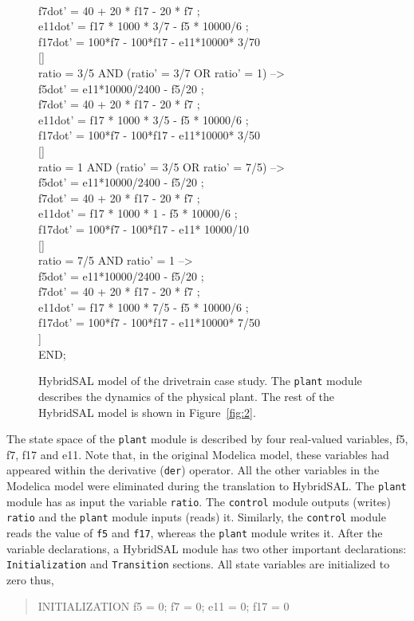 \documentclass{llncs}
\begin{document}
\begin{figure}[htb!]
\begin{tt}
\begin{tabbing}
\\ \>
  f7dot' = 40 + 20 * f17 - 20 * f7 ;
\\ \>
  e11dot' = f17 * 1000 * 3/7 - f5 * 10000/6 ;
\\ \>
  f17dot' = 100*f7 - 100*f17 - e11*10000* 3/70
\\
 \mbox{[]}
\\
ratio = 3/5 AND (ratio' = 3/7 OR ratio' = 1) --> 
\\ \>
  f5dot' = e11*10000/2400 - f5/20 ;
\\ \>
  f7dot' = 40 + 20 * f17 - 20 * f7 ;
\\ \>
  e11dot' = f17 * 1000 * 3/5 - f5 * 10000/6 ;
\\ \>
  f17dot' = 100*f7 - 100*f17 - e11*10000* 3/50
\\
 \mbox{[]}
\\
ratio = 1 AND (ratio' = 3/5 OR ratio' = 7/5) --> 
\\ \>
  f5dot' = e11*10000/2400 - f5/20 ;
\\ \>
  f7dot' = 40 + 20 * f17 - 20 * f7 ;
\\ \>
  e11dot' = f17 * 1000 * 1 - f5 * 10000/6 ;
\\ \>
  f17dot' = 100*f7 - 100*f17 - e11* 10000/10
\\
 \mbox{[]}
\\
ratio = 7/5 AND ratio' = 1 --> 
\\ \>
  f5dot' = e11*10000/2400 - f5/20 ;
\\ \>
  f7dot' = 40 + 20 * f17 - 20 * f7 ;
\\ \>
  e11dot' = f17 * 1000 * 7/5 - f5 * 10000/6 ;
\\ \>
  f17dot' = 100*f7 - 100*f17 - e11*10000* 7/50
\\
 \mbox{]}
\\
END;
\end{tabbing}
\end{tt}
\caption{HybridSAL model of the drivetrain case study. The {\tt{plant}} module describes the
dynamics of the physical plant. The rest of the HybridSAL model is shown in Figure~\ref{fig:2}.}
\label{fig:1}
\end{figure}

The state space of the {\tt{plant}} module is described by four real-valued variables,
f5, f7, f17 and e11. 
Note that, in the original Modelica model, these variables had appeared within the derivative
({\tt{der}}) operator.
All the other variables in the Modelica model were eliminated during the translation
to HybridSAL.
The {\tt{plant}} module has as input the variable {\tt{ratio}}.
The {\tt{control}} module outputs (writes) {\tt{ratio}} and the {\tt{plant}} module inputs (reads) it.
Similarly,
the {\tt{control}} module reads the value of {\tt{f5}} and {\tt{f17}}, whereas
the {\tt{plant}} module writes it.
After the variable declarations, a HybridSAL module has two other important declarations:
{\tt{Initialization}} and {\tt{Transition}} sections.
All state variables are initialized to zero thus,
\begin{quote}
\begin{tt}
INITIALIZATION f5 = 0; f7 = 0; e11 = 0; f17 = 0
\end{tt}
\end{quote}
\end{document}
